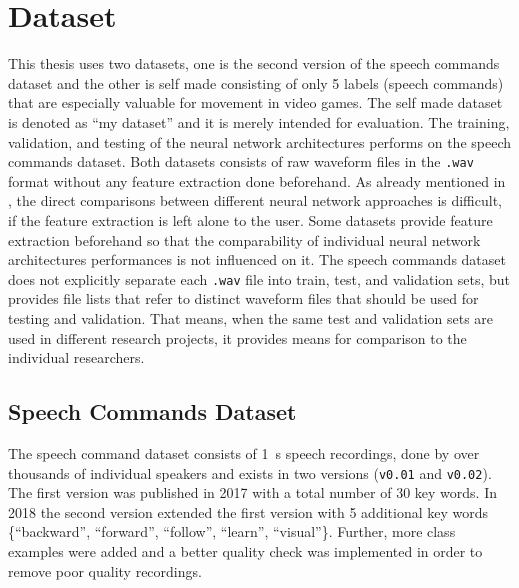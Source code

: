
\section{Dataset}\label{sec:exp_dataset}
This thesis uses two datasets, one is the second version of the speech commands dataset \cite{Warden2018} and the other is self made consisting of only 5 labels (speech commands) that are especially valuable for movement in video games.
The self made dataset is denoted as \enquote{my dataset} and it is merely intended for evaluation.
The training, validation, and testing of the neural network architectures performs on the speech commands dataset.
Both datasets consists of raw waveform files in the \texttt{.wav} format without any feature extraction done beforehand.
As already mentioned in , the direct comparisons between different neural network approaches is difficult, if the feature extraction is left alone to the user.
Some datasets provide feature extraction beforehand so that the comparability of individual neural network architectures performances is not influenced on it.
The speech commands dataset does not explicitly separate each \texttt{.wav} file into train, test, and validation sets, but provides file lists that refer to distinct waveform files that should be used for testing and validation. 
That means, when the same test and validation sets are used in different research projects, it provides means for comparison to the individual researchers.



\subsection{Speech Commands Dataset}\label{sec:exp_dataset_speech_cmd}
The speech command dataset \cite{Warden2018} consists of \SI{1}{\second} speech recordings, done by over thousands of individual speakers and exists in two versions (\texttt{v0.01} and \texttt{v0.02}).
The first version was published in 2017 with a total number of 30 key words.
In 2018 the second version extended the first version with 5 additional key words \{\enquote{backward}, \enquote{forward}, \enquote{follow}, \enquote{learn}, \enquote{visual}\}.
Further, more class examples were added and a better quality check was implemented in order to remove poor quality recordings.

